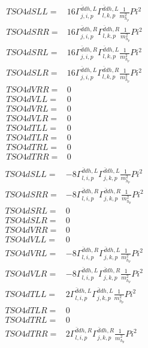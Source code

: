 \documentclass[A4,landscape]{article}
\begin{document}
\begin{align} 
  TSO4dSLL= & 16 \Gamma^{\bar{d}d h ,L}_{j, i, p} \Gamma^{\bar{d}d h ,L}_{l, k, p} \frac{1}{m^2_{h_{{p}}}} Pi^2 \\ 
  TSO4dSRR= & 16 \Gamma^{\bar{d}d h ,R}_{j, i, p} \Gamma^{\bar{d}d h ,R}_{l, k, p} \frac{1}{m^2_{h_{{p}}}} Pi^2 \\ 
  TSO4dSRL= & 16 \Gamma^{\bar{d}d h ,R}_{j, i, p} \Gamma^{\bar{d}d h ,L}_{l, k, p} \frac{1}{m^2_{h_{{p}}}} Pi^2 \\ 
  TSO4dSLR= & 16 \Gamma^{\bar{d}d h ,L}_{j, i, p} \Gamma^{\bar{d}d h ,R}_{l, k, p} \frac{1}{m^2_{h_{{p}}}} Pi^2 \\ 
  TSO4dVRR= & 0 \\ 
  TSO4dVLL= & 0 \\ 
  TSO4dVRL= & 0 \\ 
  TSO4dVLR= & 0 \\ 
  TSO4dTLL= & 0 \\ 
  TSO4dTLR= & 0 \\ 
  TSO4dTRL= & 0 \\ 
  TSO4dTRR= & 0 \\ 
\end{align} 
\begin{align} 
  TSO4dSLL= & -8 \Gamma^{\bar{d}d h ,L}_{l, i, p} \Gamma^{\bar{d}d h ,L}_{j, k, p} \frac{1}{m^2_{h_{{p}}}} Pi^2 \\ 
  TSO4dSRR= & -8 \Gamma^{\bar{d}d h ,R}_{l, i, p} \Gamma^{\bar{d}d h ,R}_{j, k, p} \frac{1}{m^2_{h_{{p}}}} Pi^2 \\ 
  TSO4dSRL= & 0 \\ 
  TSO4dSLR= & 0 \\ 
  TSO4dVRR= & 0 \\ 
  TSO4dVLL= & 0 \\ 
  TSO4dVRL= & -8 \Gamma^{\bar{d}d h ,R}_{l, i, p} \Gamma^{\bar{d}d h ,L}_{j, k, p} \frac{1}{m^2_{h_{{p}}}} Pi^2 \\ 
  TSO4dVLR= & -8 \Gamma^{\bar{d}d h ,L}_{l, i, p} \Gamma^{\bar{d}d h ,R}_{j, k, p} \frac{1}{m^2_{h_{{p}}}} Pi^2 \\ 
  TSO4dTLL= & 2 \Gamma^{\bar{d}d h ,L}_{l, i, p} \Gamma^{\bar{d}d h ,L}_{j, k, p} \frac{1}{m^2_{h_{{p}}}} Pi^2 \\ 
  TSO4dTLR= & 0 \\ 
  TSO4dTRL= & 0 \\ 
  TSO4dTRR= & 2 \Gamma^{\bar{d}d h ,R}_{l, i, p} \Gamma^{\bar{d}d h ,R}_{j, k, p} \frac{1}{m^2_{h_{{p}}}} Pi^2 \\ 
\end{align} 
\end{document}

